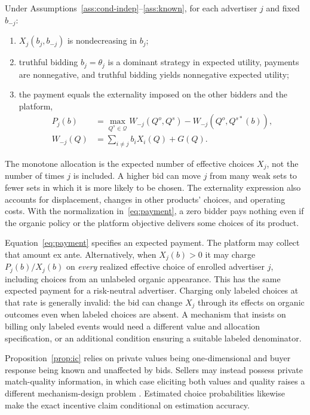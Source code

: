 \documentclass[opre,dblanonrev]{informs4}
\providecommand{\1}{\mathbf{1}}
\begin{document}
\begin{proposition}[Implementation]\label{prop:ic}
Under Assumptions~\ref{ass:cond-indep}--\ref{ass:known}, for each advertiser $j$ and fixed $b_{-j}$:
\begin{enumerate}
\item[(a)] $X_j(b_j,b_{-j})$ is nondecreasing in $b_j$;
\item[(b)] truthful bidding $b_j=\theta_j$ is a dominant strategy in expected utility, payments are nonnegative, and truthful bidding yields nonnegative expected utility;
\item[(c)] the payment equals the externality imposed on the other bidders and the platform,
\[
\begin{aligned}
P_j(b)&=\max_{Q^s\in\mathcal Q}W_{-j}(Q^o,Q^s)
       -W_{-j}(Q^o,Q^{s\ast}(b)),\\
W_{-j}(Q)&=\sum_{i\ne j}b_iX_i(Q)+G(Q).
\end{aligned}
\]
\end{enumerate}
\end{proposition}

The monotone allocation is the expected number of effective choices $X_j$, not the number of times $j$ is included. A higher bid can move $j$ from many weak sets to fewer sets in which it is more likely to be chosen. The externality expression also accounts for displacement, changes in other products' choices, and operating costs. With the normalization in~\eqref{eq:payment}, a zero bidder pays nothing even if the organic policy or the platform objective delivers some choices of its product.

Equation~\eqref{eq:payment} specifies an expected payment. The platform may collect that amount ex ante. Alternatively, when $X_j(b)>0$ it may charge $P_j(b)/X_j(b)$ on \emph{every} realized effective choice of enrolled advertiser $j$, including choices from an unlabeled organic appearance. This has the same expected payment for a risk-neutral advertiser. Charging only labeled choices at that rate is generally invalid: the bid can change $X_j$ through its effects on organic outcomes even when labeled choices are absent. A mechanism that insists on billing only labeled events would need a different value and allocation specification, or an additional condition ensuring a suitable labeled denominator.

Proposition~\ref{prop:ic} relies on private values being one-dimensional and buyer response being known and unaffected by bids. Sellers may instead possess private match-quality information, in which case eliciting both values and quality raises a different mechanism-design problem \citep{balseiro2023incentive}. Estimated choice probabilities likewise make the exact incentive claim conditional on estimation accuracy.
\end{document}
